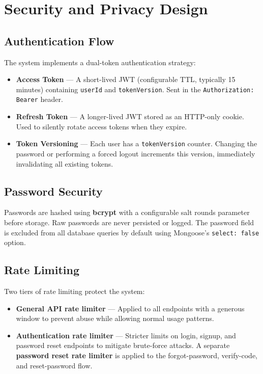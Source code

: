 \section{Security and Privacy Design}

\subsection{Authentication Flow}
The system implements a dual-token authentication strategy:
\begin{itemize}[leftmargin=*]
    \item \textbf{Access Token} — A short-lived JWT (configurable TTL, typically 15 minutes) containing \texttt{userId} and \texttt{tokenVersion}. Sent in the \texttt{Authorization: Bearer} header.
    \item \textbf{Refresh Token} — A longer-lived JWT stored as an HTTP-only cookie. Used to silently rotate access tokens when they expire.
    \item \textbf{Token Versioning} — Each user has a \texttt{tokenVersion} counter. Changing the password or performing a forced logout increments this version, immediately invalidating all existing tokens.
\end{itemize}

\subsection{Password Security}
Passwords are hashed using \textbf{bcrypt} with a configurable salt rounds parameter before storage. Raw passwords are never persisted or logged. The password field is excluded from all database queries by default using Mongoose's \texttt{select: false} option.

\subsection{Rate Limiting}
Two tiers of rate limiting protect the system:
\begin{itemize}[leftmargin=*]
    \item \textbf{General API rate limiter} — Applied to all endpoints with a generous window to prevent abuse while allowing normal usage patterns.
    \item \textbf{Authentication rate limiter} — Stricter limits on login, signup, and password reset endpoints to mitigate brute-force attacks. A separate \textbf{password reset rate limiter} is applied to the forgot-password, verify-code, and reset-password flow.
\end{itemize}

